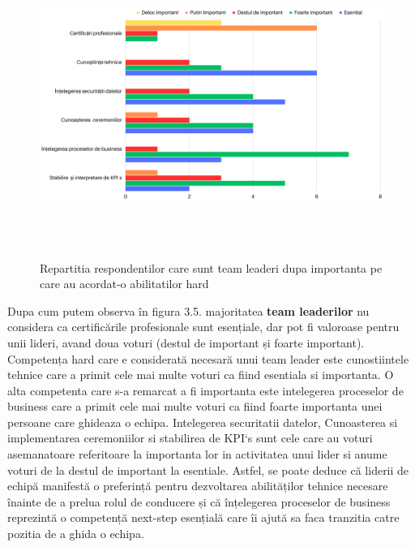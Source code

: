 \documentclass[a4paper, 12pt]{article}
\begin{document}
\begin{enumerate}[A)]
\newpage
		\begin{figure}[!htb]
			\centering
			\includegraphics[width=15cm, height=10cm]{"figures/team leaders (1).png"}
			\caption {Repartitia respondentilor care sunt team leaderi dupa importanta pe care au acordat-o abilitatilor hard}\label{fig:four}
			
		\end{figure}

	\quad Dupa cum putem observa în figura 3.5. majoritatea \textbf{team leaderilor} nu considera ca certificările profesionale sunt esențiale, dar pot fi valoroase pentru unii lideri, avand doua voturi (destul de important și foarte important). Competența hard care e considerată necesară unui team leader este cunostiintele tehnice care a primit cele mai multe voturi ca fiind esentiala si importanta. O alta competenta  care s-a remarcat a fi importanta este intelegerea proceselor de business care a primit cele mai multe voturi ca fiind foarte importanta unei persoane care ghideaza o echipa. Intelegerea securitatii datelor, Cunoasterea si implementarea ceremoniilor si stabilirea de KPI`s sunt cele care au voturi asemanatoare referitoare la importanta lor in activitatea unui lider si anume voturi de la destul de important la esentiale. Astfel, se poate deduce că liderii de echipă manifestă o preferință pentru dezvoltarea abilităților tehnice necesare înainte de a prelua rolul de conducere și că înțelegerea proceselor de business reprezintă o competență next-step esențială care îi ajută sa faca tranzitia catre pozitia de a ghida o echipa. 



\end{enumerate}
\end{document}
